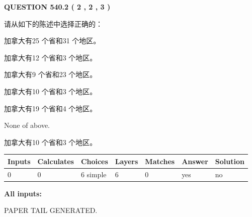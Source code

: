 \documentclass{ctexart}
\begin{document}
   
  
\vspace{0.2in}
  
{\textbf{\Large{QUESTION
540.2 
 ( 2 , 2 , 3 )
}}}
  
  
请从如下的陈述中选择正确的：
 
 
加拿大有25 个省和31 个地区。
 
 
加拿大有12 个省和3 个地区。
 
 
加拿大有9 个省和23 个地区。
 
 
加拿大有10 个省和3 个地区。
 
 
加拿大有19 个省和4 个地区。
 
 
 None of above.
 
 
\noindent{}
 
 
加拿大有10 个省和3 个地区。
 
 
\noindent{}
 
 
   
   
   
   
\noindent\begin{tabular}{|l|l|l|l|l|l|l|}
 \hline
Inputs & Calculates & Choices & Layers & Matches & Answer & Solution \\ \hline
 0  & 
 0  & 
 6
  simple  
  & 
 6  & 
 0  & 
  yes & 
  no 
  \\ \hline
 \end{tabular}
   
   
   
   
\noindent{}
   
   
   
   
\noindent\vspace{0.1in}\hspace{-0.08in} {\textbf{\Large{All inputs: }}}
   
   
   
   
   
   
 \vspace{0.2in}
 
   
   
\vspace{2.0in} PAPER TAIL GENERATED.
   
\end{document}
